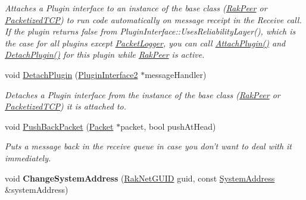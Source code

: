 \begin{DoxyCompactItemize}
\begin{DoxyCompactList}\small\item\em Attaches a Plugin interface to an instance of the base class (\hyperlink{class_rak_net_1_1_rak_peer}{Rak\-Peer} or \hyperlink{class_rak_net_1_1_packetized_t_c_p}{Packetized\-T\-C\-P}) to run code automatically on message receipt in the Receive call. If the plugin returns false from Plugin\-Interface\-::\-Uses\-Reliability\-Layer(), which is the case for all plugins except \hyperlink{class_rak_net_1_1_packet_logger}{Packet\-Logger}, you can call \hyperlink{class_rak_net_1_1_rak_peer_a4ceacd63ae51089a2e36287c54f07ffe}{Attach\-Plugin()} and \hyperlink{class_rak_net_1_1_rak_peer_a9f29151642a0ad0abdddc6d9a8f25239}{Detach\-Plugin()} for this plugin while \hyperlink{class_rak_net_1_1_rak_peer}{Rak\-Peer} is active. \end{DoxyCompactList}\item 
void \hyperlink{class_rak_net_1_1_rak_peer_a9f29151642a0ad0abdddc6d9a8f25239}{Detach\-Plugin} (\hyperlink{class_rak_net_1_1_plugin_interface2}{Plugin\-Interface2} $\ast$message\-Handler)
\begin{DoxyCompactList}\small\item\em Detaches a Plugin interface from the instance of the base class (\hyperlink{class_rak_net_1_1_rak_peer}{Rak\-Peer} or \hyperlink{class_rak_net_1_1_packetized_t_c_p}{Packetized\-T\-C\-P}) it is attached to. \end{DoxyCompactList}\item 
void \hyperlink{class_rak_net_1_1_rak_peer_ac32f687f4bbd396e326be77ac1fa77a8}{Push\-Back\-Packet} (\hyperlink{struct_rak_net_1_1_packet}{Packet} $\ast$packet, bool push\-At\-Head)
\begin{DoxyCompactList}\small\item\em Puts a message back in the receive queue in case you don't want to deal with it immediately. \end{DoxyCompactList}\item 
\hypertarget{class_rak_net_1_1_rak_peer_a94b4e587eadf29de298b4f38310215c7}{void {\bfseries Change\-System\-Address} (\hyperlink{struct_rak_net_1_1_rak_net_g_u_i_d}{Rak\-Net\-G\-U\-I\-D} guid, const \hyperlink{struct_rak_net_1_1_system_address}{System\-Address} \&system\-Address)}\label{class_rak_net_1_1_rak_peer_a94b4e587eadf29de298b4f38310215c7}


\end{DoxyCompactItemize}
